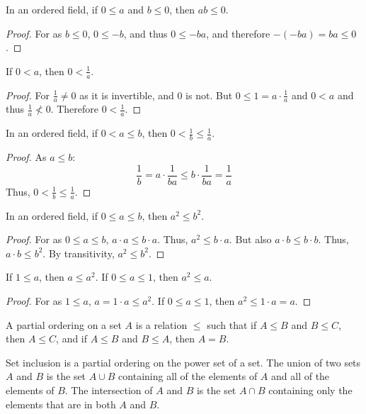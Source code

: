     \begin{theorem}
        In an ordered field, if $0\leq a$ and $b\leq 0$, then $ab\leq 0$.
    \end{theorem}
    \begin{proof}
        For as $b\leq 0$, $0\leq -b$, and thus $0\leq -ba$, and therefore
        $-(-ba) = ba \leq 0$.
    \end{proof}
    \begin{theorem}
        If $0< a$, then $0<\frac{1}{a}$.
    \end{theorem}
    \begin{proof}
        For $\frac{1}{a}\ne 0$ as it is invertible, and $0$ is not. But
        $0\leq1=a\cdot \frac{1}{a}$ and $0<a$ and thus $\frac{1}{a} \not <0$.
        Therefore $0<\frac{1}{a}$.
    \end{proof}
    \begin{theorem}
        In an ordered field, if $0<a\leq b$, then
        $0<\frac{1}{b}\leq\frac{1}{a}$.
    \end{theorem}
    \begin{proof}
        As $a\leq b$:
        \begin{equation}
            \frac{1}{b}
            =a\cdot\frac{1}{ba}\leq{b}\cdot\frac{1}{ba}
            =\frac{1}{a}
        \end{equation}
        Thus, $0< \frac{1}{b}\leq \frac{1}{a}$.
    \end{proof}
    \begin{theorem}
        In an ordered field, if $0 \leq a \leq b$, then $a^2 \leq b^2$.
    \end{theorem}
    \begin{proof}
        For as $0\leq{a}\leq{b}$, $a\cdot{a}\leq{b}\cdot{a}$. Thus,
        $a^{2}\leq{b}\cdot{a}$. But also $a\cdot{b}\leq{b}\cdot{b}$. Thus,
        $a\cdot{b}\leq{b}^{2}$. By transitivity, $a^{2}\leq{b}^{2}$.
    \end{proof}
    \begin{theorem}
        If $1\leq a$, then $a \leq a^2$. If $0\leq a \leq 1$, then
        $a^2 \leq a$.
    \end{theorem}
    \begin{proof}
        For as $1\leq a$, $a=1\cdot a \leq a^2$. If $0\leq a \leq 1$, then
        $a^2 \leq 1\cdot a = a$.
    \end{proof}
    \begin{definition}
        A partial ordering on a set $A$ is a relation $\leq$ such that if
        $A\leq{B}$ and $B\leq{C}$, then $A\leq{C}$, and if $A\leq{B}$ and
        $B\leq{A}$, then $A=B$.
    \end{definition}
    Set inclusion is a partial ordering on the power set of a set. The union
    of two sets $A$ and $B$ is the set $A\cup{B}$ containing all of the
    elements of $A$ and all of the elements of $B$. The intersection of $A$
    and $B$ is the set $A\cap{B}$ containing only the elements that are in
    both $A$ and $B$.